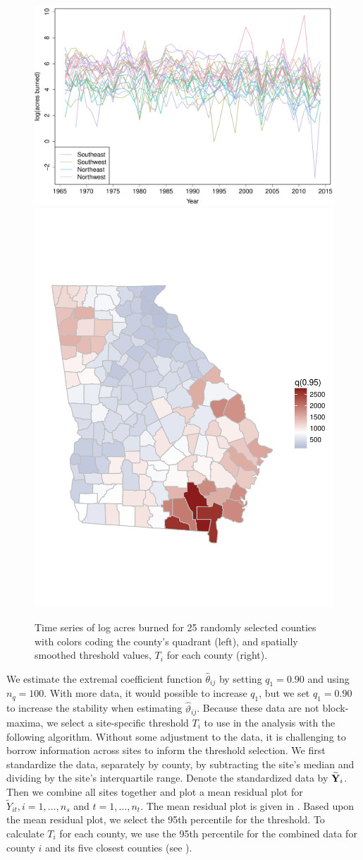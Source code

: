 \documentclass[11pt]{article}
\begin{document}
\begin{figure}[htbp]  %
  \centering
  \includegraphics[width=0.55\linewidth]{plots/fire-spag-rand-25}
  \includegraphics[width=0.44\linewidth, trim = 0 8em 0 10em]{plots/fire-spatial-q95.pdf}
  \caption{Time series of log acres burned for 25 randomly selected counties with colors coding the county's quadrant (left), and spatially smoothed threshold values, $T_i$ for each county (right).}
  \label{ebfig:firets25}
\end{figure}

We estimate the extremal coefficient function $\hat{\theta}_{ij}$ by setting $q_1 = 0.90$ and using $n_q = 100$.
With more data, it would possible to increase $q_1$, but we set $q_1 = 0.90$ to increase the stability when estimating $\hat{\vartheta}_{ij}$.
Because these data are not block-maxima, we select a site-specific threshold $T_i$ to use in the analysis with the following algorithm.
Without some adjustment to the data, it is challenging to borrow information across sites to inform the threshold selection.
We first standardize the data, separately by county, by subtracting the site's median and dividing by the site's interquartile range.
Denote the standardized data by $\widetilde{\mbox{\bf Y}}_i$.
Then we combine all sites together and plot a mean residual plot for $\widetilde{Y}_{it}, i = 1, \ldots, n_s$ and $t = 1, \ldots, n_t$.
The mean residual plot is given in .
Based upon the mean residual plot, we select the 95th percentile for the threshold.
To calculate $T_i$ for each county, we use the 95th percentile for the combined data for county $i$ and its five closest counties (see ).
\end{document}
